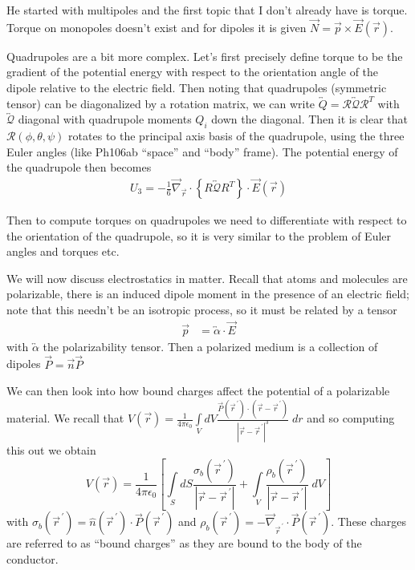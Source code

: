 \documentclass[10pt]{report}
\newcommand{\tensor}[1]{\overleftrightarrow{#1}}
\newcommand{\pvec}[1]{\vec{#1}^{\,\prime}}
\newcommand{\abs}[1]{\left|#1\right|}
\begin{document}
He started with multipoles and the first topic that I don't already have is torque. Torque on monopoles doesn't exist and for dipoles it is given $\vec{N} = \vec{p}\times\vec{E}(\vec{r})$. 

Quadrupoles are a bit more complex. Let's first precisely define torque to be the gradient of the potential energy with respect to the orientation angle of the dipole relative to the electric field. Then noting that quadrupoles (symmetric tensor) can be diagonalized by a rotation matrix, we can write $\tensor{Q} = \mathcal{R}\tensor{\mathcal{Q}}\mathcal{R}^T$ with $\tensor{\mathcal{Q}}$ diagonal with quadrupole moments $Q_i$ down the diagonal. Then it is clear that $\mathcal{R}(\phi, \theta, \psi)$ rotates to the principal axis basis of the quadrupole, using the three Euler angles (like Ph106ab ``space'' and ``body'' frame). The potential energy of the quadrupole then becomes
\begin{align}
    U_3 = -\frac{1}{6}\vec{\nabla }_{\vec{r}}\cdot \left\{ R\tensor{\mathcal{Q}}R^{T} \right\}\cdot \vec{E}(\vec{r})
\end{align}

Then to compute torques on quadrupoles we need to differentiate with respect to the orientation of the quadrupole, so it is very similar to the problem of Euler angles and torques etc.

We will now discuss electrostatics in matter. Recall that atoms and molecules are polarizable, there is an induced dipole moment in the presence of an electric field; note that this needn't be an isotropic process, so it must be related by a tensor
\begin{align}
    \vec{p} &= \tensor{\alpha}\cdot \vec{E}
\end{align}
with $\tensor{\alpha}$ the polarizability tensor. Then a polarized medium is a collection of dipoles $\vec{P} = \vec{n}\vec{P}$

We can then look into how bound charges affect the potential of a polarizable material. We recall that $V(\vec{r}) = \frac{1}{4\pi\epsilon_0}\displaystyle\int\limits_{V}^{}dV \frac{\vec{P}(\pvec{r})\cdot\left( \vec{r} - \pvec{r} \right)}{\abs{\vec{r} - \pvec{r}}^3}\;dr$ and so computing this out we obtain
\begin{equation}
    V(\vec{r}) = \frac{1}{4\pi\epsilon_0} \left[ \displaystyle\int\limits_{S}^{}dS \frac{\sigma_b(\pvec{r})}{\abs{\vec{r} - \pvec{r}}} + \displaystyle\int\limits_{V}^{}\frac{\rho_b(\pvec{r})}{\abs{\vec{r} - \pvec{r}}}\;dV \right]
\end{equation}
with $\sigma_b(\pvec{r}) = \hat{n}(\pvec{r})\cdot \vec{P}(\pvec{r})$ and $\rho_b(\pvec{r}) = -\vec{\nabla}_{\pvec{r}}\cdot\vec{P}(\pvec{r})$. These charges are referred to as ``bound charges'' as they are bound to the body of the conductor.
\end{document}
